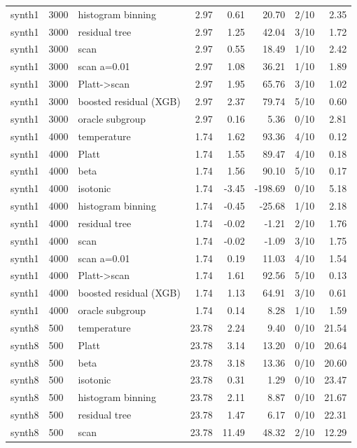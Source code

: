 \begin{tabular}{lllrrrlr}
synth1 & 3000 & histogram binning & 2.97 & 0.61 & 20.70 & 2/10 & 2.35 \\
synth1 & 3000 & residual tree & 2.97 & 1.25 & 42.04 & 3/10 & 1.72 \\
synth1 & 3000 & scan & 2.97 & 0.55 & 18.49 & 1/10 & 2.42 \\
synth1 & 3000 & scan a=0.01 & 2.97 & 1.08 & 36.21 & 1/10 & 1.89 \\
synth1 & 3000 & Platt->scan & 2.97 & 1.95 & 65.76 & 3/10 & 1.02 \\
synth1 & 3000 & boosted residual (XGB) & 2.97 & 2.37 & 79.74 & 5/10 & 0.60 \\
synth1 & 3000 & oracle subgroup & 2.97 & 0.16 & 5.36 & 0/10 & 2.81 \\
synth1 & 4000 & temperature & 1.74 & 1.62 & 93.36 & 4/10 & 0.12 \\
synth1 & 4000 & Platt & 1.74 & 1.55 & 89.47 & 4/10 & 0.18 \\
synth1 & 4000 & beta & 1.74 & 1.56 & 90.10 & 5/10 & 0.17 \\
synth1 & 4000 & isotonic & 1.74 & -3.45 & -198.69 & 0/10 & 5.18 \\
synth1 & 4000 & histogram binning & 1.74 & -0.45 & -25.68 & 1/10 & 2.18 \\
synth1 & 4000 & residual tree & 1.74 & -0.02 & -1.21 & 2/10 & 1.76 \\
synth1 & 4000 & scan & 1.74 & -0.02 & -1.09 & 3/10 & 1.75 \\
synth1 & 4000 & scan a=0.01 & 1.74 & 0.19 & 11.03 & 4/10 & 1.54 \\
synth1 & 4000 & Platt->scan & 1.74 & 1.61 & 92.56 & 5/10 & 0.13 \\
synth1 & 4000 & boosted residual (XGB) & 1.74 & 1.13 & 64.91 & 3/10 & 0.61 \\
synth1 & 4000 & oracle subgroup & 1.74 & 0.14 & 8.28 & 1/10 & 1.59 \\
synth8 & 500 & temperature & 23.78 & 2.24 & 9.40 & 0/10 & 21.54 \\
synth8 & 500 & Platt & 23.78 & 3.14 & 13.20 & 0/10 & 20.64 \\
synth8 & 500 & beta & 23.78 & 3.18 & 13.36 & 0/10 & 20.60 \\
synth8 & 500 & isotonic & 23.78 & 0.31 & 1.29 & 0/10 & 23.47 \\
synth8 & 500 & histogram binning & 23.78 & 2.11 & 8.87 & 0/10 & 21.67 \\
synth8 & 500 & residual tree & 23.78 & 1.47 & 6.17 & 0/10 & 22.31 \\
synth8 & 500 & scan & 23.78 & 11.49 & 48.32 & 2/10 & 12.29 \\

\end{tabular}
